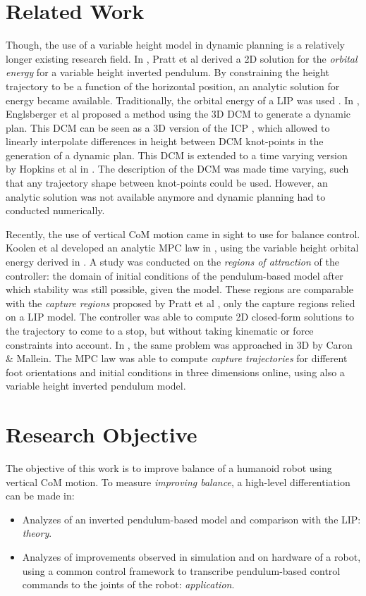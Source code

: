 \section{Related Work}
Though, the use of a variable height model in dynamic planning is a relatively longer existing research field. In \cite{pratt2007derivation}, Pratt et al derived a \ac{2D} solution for the \textit{orbital energy} for a variable height inverted pendulum. By constraining the height trajectory to be a function of the horizontal position, an analytic solution for energy became available. Traditionally, the orbital energy of a LIP was used \cite{kajita1992dynamic}. In \cite{englsberger2013three}, Englsberger et al proposed a method using the \ac{3D} \ac{DCM} to generate a dynamic plan. This \ac{DCM} can be seen as a \ac{3D} version of the \ac{ICP} \cite{koolen2012capturability}, which allowed to linearly interpolate differences in height between \ac{DCM} knot-points in the generation of a dynamic plan.  This \ac{DCM} is extended to a time varying version by Hopkins et al in \cite{hopkins2014humanoid}. The description of the \ac{DCM} was made time varying, such that any trajectory shape between knot-points could be used. However, an analytic solution was not available anymore and dynamic planning had to conducted numerically. 

Recently, the use of vertical \ac{CoM} motion came in sight to use for balance control. Koolen et al developed an analytic \ac{MPC} law in \cite{koolen2016balance}, using the variable height orbital energy derived in \cite{pratt2007derivation}. A study was conducted on the \textit{regions of attraction} of the controller: the domain of initial conditions of the pendulum-based model after which stability was still possible, given the model. These regions are comparable with the \textit{capture regions} proposed by Pratt et al \cite{pratt2006capture}, only the capture regions relied on a \ac{LIP} model. The controller was able to compute \ac{2D} closed-form solutions to the trajectory to come to a stop, but without taking kinematic or force constraints into account. In \cite{caron2018balance}, the same problem was approached in \ac{3D} by Caron \& Mallein. The \ac{MPC} law was able to compute \textit{capture trajectories} for different foot orientations and initial conditions in three dimensions online, using also a variable height inverted pendulum model.

\section{Research Objective}
The objective of this work is to improve balance of a humanoid robot using vertical \ac{CoM} motion. To measure \textit{improving balance}, a high-level differentiation can be made in:
\begin{itemize}
	\item Analyzes of an inverted pendulum-based model and comparison with the \ac{LIP}: \textit{theory}.
	\item Analyzes of improvements observed in simulation and on hardware of a robot, using a common control framework to transcribe pendulum-based control commands to the joints of the robot: \textit{application}.
\end{itemize}

